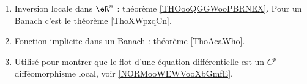 \begin{enumerate}
    \item Inversion locale dans \( \eR^n\) : théorème \ref{THOooQGGWooPBRNEX}. Pour un Banach c'est le théorème \ref{ThoXWpzqCn}.
    \item
        Fonction implicite dans un Banach : théorème \ref{ThoAcaWho}.
    \item
        Utilisé pour montrer que le flot d'une équation différentielle est un \( C^p\)-difféomorphisme local, voir \ref{NORMooWEWVooXbGmfE}. %
\end{enumerate}
